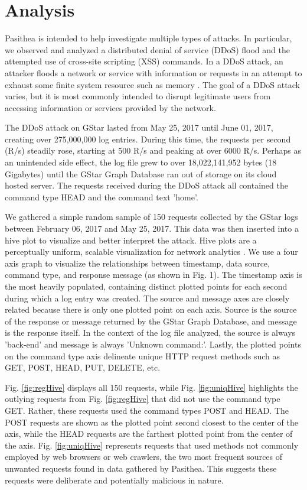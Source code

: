 
\section{Analysis} \label{Analysis}

Pasithea is intended to help investigate multiple types of attacks.  In particular, we observed and analyzed a distributed denial of service (DDoS) flood and the attempted use of cross-site scripting (XSS) commands. In a DDoS attack, an attacker floods a network or service with information or requests in an attempt to exhaust some finite system resource such as memory \cite{DoS-Def}. The goal of a DDoS attack varies, but it is most commonly intended to disrupt legitimate users from accessing information or services provided by the network.

The DDoS attack on GStar lasted from May 25, 2017 until June 01, 2017, creating over 275,000,000 log entries. During this time, the requests per second (R/s) steadily rose, starting at 500 R/s and peaking at over 6000 R/s. Perhaps as an unintended side effect, the log file grew to over 18,022,141,952 bytes (18 Gigabytes) until the GStar Graph Database ran out of storage on its cloud hosted server. The requests received during the DDoS attack all contained the command type HEAD and the command text 'home'.

We gathered a simple random sample of 150 requests collected by the GStar logs between February 06, 2017 and May 25, 2017.  This data was then inserted into a hive plot to visualize and better interpret the attack. Hive plots are a perceptually uniform, scalable visualization for network analytics \cite{Hive-Plot}.  We use a four axis graph to visualize the relationships between timestamp, data source, command type, and response message (as shown in Fig. 1). The timestamp axis is the most heavily populated, containing distinct plotted points for each second during which a log entry was created. The source and message axes are closely related because there is only one plotted point on each axis. Source is the source of the response or message returned by the GStar Graph Database, and message is the response itself. In the context of the log file analyzed, the source is always 'back-end' and message is always 'Unknown command:'. Lastly, the plotted points on the command type axis delineate unique HTTP request methods such as GET, POST, HEAD, PUT, DELETE, etc.

Fig. \ref{fig:regHive} displays all 150 requests, while Fig. \ref{fig:uniqHive} highlights the outlying requests from Fig. \ref{fig:regHive} that did not use the command type GET.  Rather, these requests used the command types POST and HEAD. The POST requests are shown as the plotted point second closest to the center of the axis, while the HEAD requests are the farthest plotted point from the center of the axis. Fig. \ref{fig:uniqHive} represents requests that used methods not commonly employed by web browsers or web crawlers, the two most frequent sources of unwanted requests found in data gathered by Pasithea. This suggests these requests were deliberate and potentially malicious in nature.

